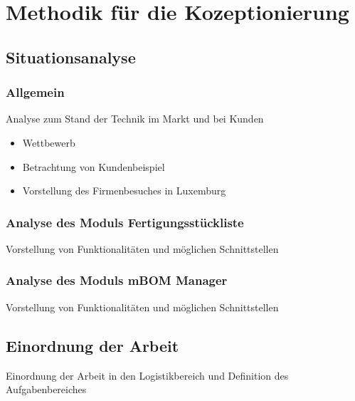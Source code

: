 \chapter{Methodik für die Kozeptionierung}

\section{Situationsanalyse}
\subsection{Allgemein}
Analyse zum Stand der Technik im Markt und bei Kunden
\begin{itemize}
	\item Wettbewerb
	\item Betrachtung von Kundenbeispiel
	\item Vorstellung des Firmenbesuches in Luxemburg
\end{itemize}

\subsection{Analyse des Moduls Fertigungsstückliste}
Vorstellung von Funktionalitäten und möglichen Schnittstellen

\subsection{Analyse des Moduls mBOM Manager}
Vorstellung von Funktionalitäten und möglichen Schnittstellen

\section{Einordnung der Arbeit}
Einordnung der Arbeit in den Logistikbereich und Definition des Aufgabenbereiches


